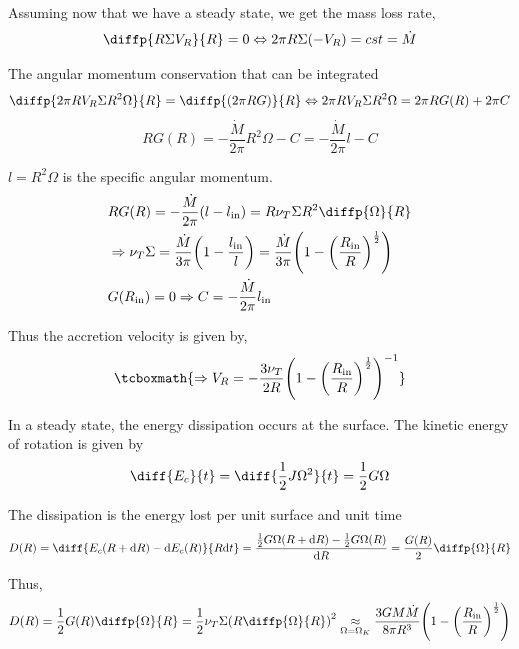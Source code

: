 \documentclass[10pt,a4paper,english]{article}
\let\originalleft\left
\let\originalright\right
\renewcommand{\left}{\mathopen{}\mathclose\bgroup\originalleft}
\renewcommand{\right}{\aftergroup\egroup\originalright}
\begin{document}
Assuming now that we have a steady state, we get the mass loss rate,
\begin{equation}
    \diffp{R \Sigma V_R}{R} = 0 \Leftrightarrow 2 \pi R \Sigma (- V_R) = cst = \dot{M}
\end{equation}

The angular momentum conservation that can be integrated
\begin{equation}
    \diffp{2 \pi R V_R \Sigma R^2 \Omega}{R} = \diffp{(2 \pi R G)}{R} \Leftrightarrow 2 \pi R V_R \Sigma R^2 \Omega = 2 \pi R G(R) + 2 \pi C
\end{equation}
\begin{equation*}
    R G(R) = - \frac{\dot{M}}{2 \pi} R^2 \Omega - C = - \frac{\dot{M}}{2 \pi} l - C
\end{equation*}

$l = R^2 \Omega$ is the specific angular momentum.
\begin{align*}
    & RG(R) = - \frac{\dot{M}}{2 \pi} (l - l_\mathrm{in}) = R \nu_T \Sigma R^2 \diffp{\Omega}{R} \\
    & \Rightarrow \nu_T \Sigma = \frac{\dot{M}}{3 \pi} \left(1 - \frac{l_\mathrm{in}}{l}\right) =
    \frac{\dot{M}}{3 \pi} \left(1 - \left(\frac{R_\mathrm{in}}{R}\right)^\frac{1}{2}\right) \\
    &G(R_\mathrm{in}) = 0 \Rightarrow C = - \frac{\dot{M}}{2 \pi} l_\mathrm{in}
\end{align*}

Thus the accretion velocity is given by,
\begin{equation}
    \tcboxmath{
        \Rightarrow V_R = - \frac{3 \nu_T}{2 R} \left(1 - \left(\frac{R_\mathrm{in}}{R}\right)^\frac{1}{2}\right)^{-1}
    }
\end{equation}

In a steady state, the energy dissipation occurs at the surface. The kinetic
energy of rotation is given by
\begin{equation*}
    \diff{E_c}{t} = \diff{\frac{1}{2} J \Omega^2}{t} = \frac{1}{2} G \Omega
\end{equation*}

The dissipation is the energy lost per unit surface and unit time
\begin{equation*}
    D(R) = \diff{E_c(R+\d{R}) - \d{E_c(R)}}{R \d{t}} = \frac{\frac{1}{2} G \Omega(R+\d{R}) - \frac{1}{2} G \Omega(R)}{\d{R}} = \frac{G(R)}{2} \diffp{\Omega}{R}
\end{equation*}

Thus,
\begin{equation*}
    D(R) = \frac{1}{2} G(R) \diffp{\Omega}{R} = \frac{1}{2} \nu_T \Sigma \left( R \diffp{\Omega}{R} \right)^2 \underset{\Omega = \Omega_K}{\approx}
    \frac{3 G M \dot{M}}{8 \pi R^3} \left(1 - \left(\frac{R_\mathrm{in}}{R}\right)^\frac{1}{2}\right)
\end{equation*}
\end{document}
